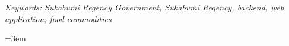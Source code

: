 \documentclass{pkl}
\begin{document}
\vspace{1cm}

\noindent\textit{Keywords: Sukabumi Regency Government, Sukabumi Regency, backend, web application, food commodities}

\tableofcontents
{}

\listoftables
{}

\listoffigures
{}

\listofappendices

\clearpage{}\setcounter{page}{1}








\begingroup
\emergencystretch=3em
\sloppy
\printbibliography[title={DAFTAR PUSTAKA}]
\endgroup


\end{document}
